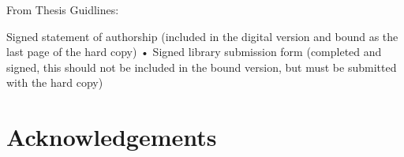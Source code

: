 
From Thesis Guidlines: 

Signed statement of authorship (included in the digital version and bound as the last page
of the hard copy)
• Signed library submission form (completed and signed, this should not be included in the
bound version, but must be submitted with the hard copy)

\section*{Acknowledgements}